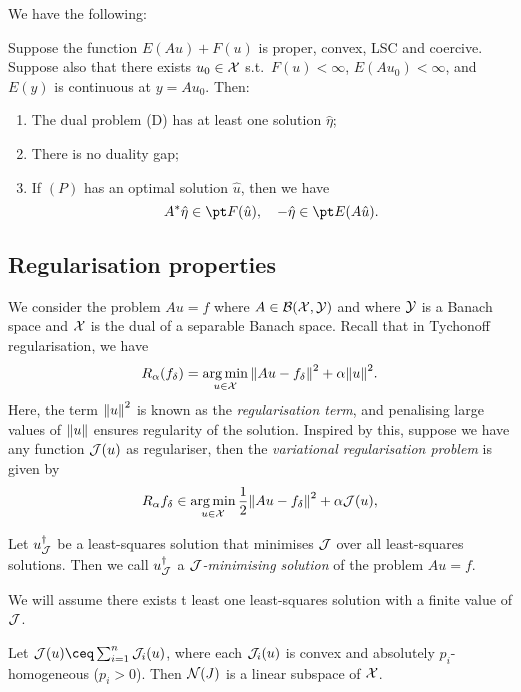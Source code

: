 We have the following:
\begin{theorem} \label{thm:primal_dual_gap}
	Suppose the function $E(Au) + F(u)$ is proper, convex, LSC and coercive. Suppose also that there exists $u_0 \in \mathcal X$ s.t.\ $F(u)< \infty$, $E(Au_0) < \infty$, and $E(y)$ is continuous at $y = A u_0$. Then:
	\begin{enumerate}
		\item The dual problem (D) has at least one solution $\hat\eta$;
		\item There is no duality gap;
		\item If $(P)$ has an optimal solution $\hat u$, then we have
		\[
		A^*\hat\eta \in \pt F(\hat u), \quad -\hat\eta \in \pt E(A\hat u). 
		\]
	\end{enumerate}
\end{theorem}

\subsection{Regularisation properties}
We consider the problem $Au = f$ where $A \in \mathcal B(\mathcal X, \mathcal Y)$ and where $\mathcal Y$ is a Banach space and $\mathcal X$ is the dual of a separable Banach space.  Recall that in Tychonoff regularisation, we have
\[
R_\alpha(f_\delta) = \operatorname*{arg\,min}_{u \in \mathcal X} \norm{Au - f_\delta}^2 + \alpha \norm{u}^2. 
\]
Here, the term $\norm{u}^2$ is known as the \emph{regularisation term}, and penalising large values of $\norm{u}$ ensures regularity of the solution. Inspired by this, suppose we have any function $\mathcal J(u)$ as regulariser, then the \emph{variational regularisation problem} is given by
\[
R_\alpha f_\delta \in \operatorname*{arg\,min}_{u \in \mathcal X} \frac12 \norm{Au - f_\delta}^2 + \alpha \mathcal J(u), 
\]
\begin{definition}
	Let $u_\mathcal J^\dagger$ be a least-squares solution that minimises $\mathcal J$ over all least-squares solutions. Then we call $u_\mathcal J^\dagger$ a \emph{$\mathcal J$-minimising solution} of the problem $Au = f$. 
\end{definition}

\begin{convention}
	We will assume there exists t least one least-squares solution with a finite value of $\mathcal J$. 
\end{convention}

\begin{lemma} \label{lem:null_space_subspace}
	Let $\JJ(u) \ceq \sum_{i=1}^n \JJ_i(u)$, where each $\mathcal J_i(u)$ is convex and absolutely $p_i$-homogeneous ($p_i > 0$). Then $\operatorname{\mathcal N}(J)$ is a linear subspace of $\mathcal X$. 
\end{lemma}

